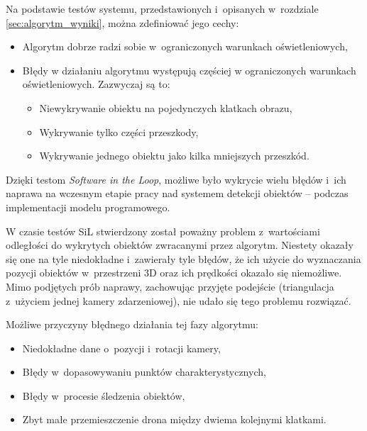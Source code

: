 Na podstawie testów systemu, przedstawionych i~opisanych w~rozdziale \ref{sec:algorytm_wyniki}, można zdefiniować jego cechy:
\begin{itemize}
    \item Algorytm dobrze radzi sobie w~ograniczonych warunkach oświetleniowych,
    \item Błędy w działaniu algorytmu występują częściej w ograniczonych warunkach oświetleniowych. Zazwyczaj są to:
    \begin{itemize}
        \item Niewykrywanie obiektu na pojedynczych klatkach obrazu,
        \item Wykrywanie tylko części przeszkody,
        \item Wykrywanie jednego obiektu jako kilka mniejszych przeszkód.
    \end{itemize}
\end{itemize}

Dzięki testom \textit{Software in the Loop}, możliwe było wykrycie wielu błędów i~ich naprawa na wczesnym etapie pracy nad systemem detekcji obiektów -- podczas implementacji modelu programowego.

W czasie testów SiL stwierdzony został poważny problem z~wartościami odległości do wykrytych obiektów zwracanymi przez algorytm. Niestety okazały się one na tyle niedokładne i~zawierały tyle błędów, że ich użycie do wyznaczania pozycji obiektów w~przestrzeni 3D oraz ich prędkości okazało się niemożliwe. Mimo podjętych prób naprawy, zachowując przyjęte podejście (triangulacja z~użyciem jednej kamery zdarzeniowej), nie udało się tego problemu rozwiązać.

Możliwe przyczyny błędnego działania tej fazy algorytmu:
\begin{itemize}
    \item Niedokładne dane o~pozycji i~rotacji kamery,
    \item Błędy w~dopasowywaniu punktów charakterystycznych,
    \item Błędy w~procesie śledzenia obiektów,
    \item Zbyt małe przemieszczenie drona między dwiema kolejnymi klatkami.
\end{itemize}

